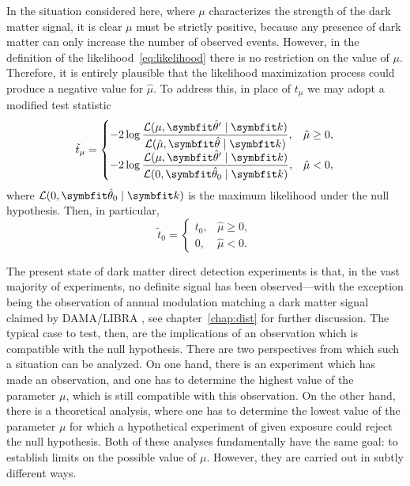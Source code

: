 In the situation considered here, where $\mu$ characterizes the strength of the dark matter signal, it is clear $\mu$ must be strictly positive, because any presence of dark matter can only increase the number of observed events. However, in the definition of the likelihood~\eqref{eq:likelihood} there is no restriction on the value of $\mu$. Therefore, it is entirely plausible that the likelihood maximization process could produce a negative value for $\hat{\mu}$. To address this, in place of $t_\mu$ we may adopt a modified test statistic \parencite{BaxterEtAl2021}
\begin{equation}
    \tilde{t}_\mu=
    \begin{cases}
        \displaystyle-2\log\frac{\mathcal{L}(\mu,\unitv{\theta}'\mid\vec{k})}{\mathcal{L}(\hat{\mu},\unitv{\theta}\mid\vec{k})},&\hat{\mu}\geq0,\\
        \displaystyle-2\log\frac{\mathcal{L}(\mu,\unitv{\theta}'\mid\vec{k})}{\mathcal{L}(0,\unitv{\theta}_0\mid\vec{k})},&\hat{\mu}<0,
    \end{cases}
\end{equation}
where $\mathcal{L}(0,\unitv{\theta}_0\mid\vec{k})$ is the maximum likelihood under the null hypothesis. Then, in particular,
\begin{equation}
    \tilde{t}_0=
    \begin{cases}
        t_0,&\hat{\mu}\geq0,\\
        0,&\hat{\mu}<0.
    \end{cases}
\end{equation}

The present state of dark matter direct detection experiments is that, in the vast majority of experiments, no definite signal has been observed---with the exception being the observation of annual modulation matching a dark matter signal claimed by DAMA/LIBRA \parencite{BernabeiEtAl2023}, see chapter~\ref{chap:dist} for further discussion. The typical case to test, then, are the implications of an observation which is compatible with the null hypothesis. There are two perspectives from which such a situation can be analyzed. On one hand, there is an experiment which has made an observation, and one has to determine the highest value of the parameter $\mu$, which is still compatible with this observation. On the other hand, there is a theoretical analysis, where one has to determine the lowest value of the parameter $\mu$ for which a hypothetical experiment of given exposure could reject the null hypothesis. Both of these analyses fundamentally have the same goal: to establish limits on the possible value of $\mu$. However, they are carried out in subtly different ways.

